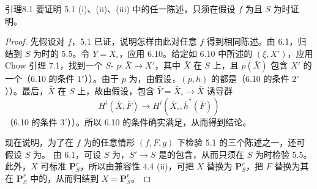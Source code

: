 \begin{SGAresult}{引理}{8.1}
要证明 5.1 (i)、(ii)、(iii) 中的任一陈述，只须在假设 $f$ 为且 $S$ 为时证明。
\end{SGAresult}
\begin{proof}
先假设对 $f$，5.1 已证，说明怎样由此对任意 $f$ 得到相同陈述。由 6.1，归结到 $S$ 为时的 5.5。令 $Y=X_\circ$，应用 6.10。给定如 6.10 中所述的 $(\xi,X')$，应用 Chow 引理 7.1，找到一个 $S$- $p:\bar X\to X'$，其中 $\bar X$ 在 $S$ 上，且 $p(\bar X)$ 包含 $X'$ 的一个（6.10 的条件 $1^\circ$））。由于 $p$ 为，由假设，$(p,h)$ 的都是（6.10 的条件 $2^\circ$））。最后，$\bar X$ 在 $S$ 上，故由假设，包含 $\bar Y=\bar X_\circ\to\bar X$ 诱导群
\[
H^i(\bar X,\bar F)\longrightarrow H^i(\bar X_\circ,\bar h^*(\bar F))
\]
（6.10 的条件 $3^\circ$））。所以 6.10 的条件确实满足，从而得到结论。

现在说明，为了在 $f$ 为的任意情形 $(f,F,g)$ 下检验 5.1 的三个陈述之一，还可假设 $S$ 为。
由 6.1，可设 $S$ 为，$S'\to S$ 是的包含，从而只须在 $S$ 为时检验 5.5。此外，$X$ 可标准 $\mathbf P^r_S$，所以由兼容性 4.4 (ii)，可把 $X$ 替换为 $\mathbf P^r_S$，把 $F$ 替换为其在 $\mathbf P^r_S$ 中的，从而归结到 $X=\mathbf P^r_S$。


\end{proof}
